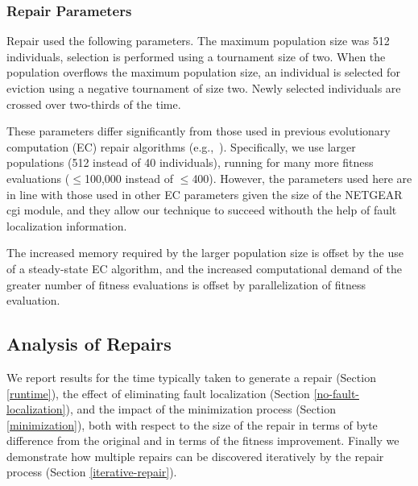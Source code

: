 \documentclass{sigcomm-alternate}
\begin{document}
{\subsubsection{Repair Parameters}
\label{sec:parameters}
Repair used the following parameters.  The maximum population
size was 512 individuals, selection is performed using a tournament
size of two.
When the population overflows the
maximum population size, an individual is selected for eviction using
a negative tournament of size two.  Newly selected individuals are
crossed over two-thirds of the time.

These parameters differ significantly from those used in previous
evolutionary computation (EC)
repair algorithms
(e.g.,~\cite{forrest2009genetic,legoues2011systematicstudy,le2012representations}).
Specifically, we use larger populations (512 instead of 40 individuals),
running for many more fitness evaluations ($\leq$100,000 instead of
$\leq$400).  However, the parameters used here are in line with
those used in other EC parameters given the size of the NETGEAR cgi
module, and they
allow our technique to succeed withouth the help of fault localization
information.

The increased memory required by the larger population size is offset
by the use of a steady-state EC algorithm, and the increased
computational demand of the greater number of fitness evaluations is
offset by parallelization of fitness evaluation.

\subsection{Analysis of Repairs}
\label{analysis}

We report results for the time typically taken to generate a repair
(Section \ref{runtime}), the effect of eliminating fault localization
(Section \ref{no-fault-localization}), and the impact of the
minimization process (Section \ref{minimization}), both with respect
to the size of the repair in terms of byte difference from the
original and in terms of the fitness improvement.  Finally we
demonstrate how multiple repairs can be discovered iteratively by the
repair process (Section \ref{iterative-repair}).

}
\end{document}
